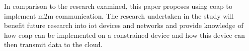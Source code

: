 In comparison to the research examined, this paper proposes using \gls{coap} to 
implement \gls{m2m} communication. 
The research undertaken in the study will benefit future research into \gls{iot}
devices and networks and provide knowledge of how \gls{coap} can be 
implemented on a constrained device and how this device can then transmit
data to the cloud.